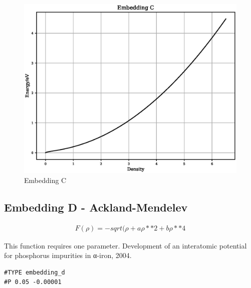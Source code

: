 \documentclass[12pt,twoside]{manual}
\begin{document}
\begin{appendices}
\FloatBarrier
\begin{figure}[h]
  \begin{center}
    \includegraphics[scale=0.5]{img/plots/embedding_c.eps}
    \caption{Embedding C}
    \label{graph:graph1}
  \end{center}
\end{figure}
\FloatBarrier








\subsection{Embedding D - Ackland-Mendelev}

\begin{equation}
\begin{split}
F(\rho) = -sqrt({\rho} + a \rho**2 + b \rho**4
\end{split}
\label{eq:embeddingD}
\end{equation}

This function requires one parameter. 
Development of an interatomic potential for phosphorus impurities in α-iron, 2004.


\begin{lstlisting}[style=pseudocode,caption={Embedding D}]
#TYPE embedding_d
#P 0.05 -0.00001
\end{lstlisting}


\end{appendices}
\end{document}
